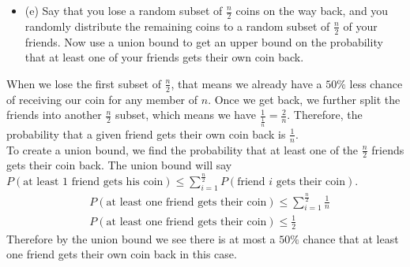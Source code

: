 \documentclass{article}
\begin{document}
\begin{enumerate}
\begin{itemize}
    \item (e) Say that you lose a random subset of $\frac{n}{2}$ coins on the way back, and you randomly distribute the remaining coins to a random subset of $\frac{n}{2}$ of your friends. Now use a union bound to get an upper bound on the probability that at least one of your friends gets their own coin back.
\end{itemize}
When we lose the first subset of $\frac{n}{2}$, that means we already have a $50\%$ less chance of receiving our coin for any member of $n$. Once we get back, we further split the friends into another $\frac{n}{2}$ subset, which means we have $\frac{1}{\frac{1}{n}} = \frac{2}{n}$. Therefore, the probability that a given friend gets their own coin back is $\frac{1}{n}$. \\
\newline 
To create a union bound, we find the probability that at least one of the $\frac{n}{2}$ friends gets their coin back. The union bound will say $P(\text{at least 1 friend gets his coin}) \leq \sum_{i=1}^{\frac{n}{2}} P(\text{friend $i$ gets their coin})$.
\begin{align*}
    & P(\text{at least one friend gets their coin}) \leq \sum_{i=1}^{\frac{n}{2}} \frac{1}{n} \\
    & P(\text{at least one friend gets their coin}) \leq \frac{1}{2}
\end{align*}
Therefore by the union bound we see there is at most a $50\%$ chance that at least one friend gets their own coin back in this case.








\end{enumerate}
\end{document}
